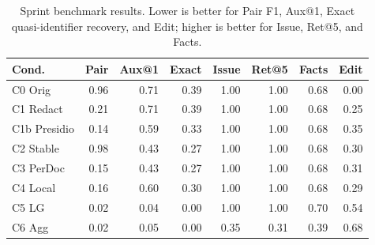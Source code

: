 \begin{table}[t]
\centering
\scriptsize
\setlength{\tabcolsep}{3pt}
\caption{Sprint benchmark results. Lower is better for Pair F1, Aux@1, Exact quasi-identifier recovery, and Edit; higher is better for Issue, Ret@5, and Facts.}
\label{tab:paper_main_results}
\begin{tabular}{lrrrrrrr}
\toprule
Cond. & Pair & Aux@1 & Exact & Issue & Ret@5 & Facts & Edit \\
\midrule
C0 Orig & 0.96 & 0.71 & 0.39 & 1.00 & 1.00 & 0.68 & 0.00 \\
C1 Redact & 0.21 & 0.71 & 0.39 & 1.00 & 1.00 & 0.68 & 0.25 \\
C1b Presidio & 0.14 & 0.59 & 0.33 & 1.00 & 1.00 & 0.68 & 0.35 \\
C2 Stable & 0.98 & 0.43 & 0.27 & 1.00 & 1.00 & 0.68 & 0.30 \\
C3 PerDoc & 0.15 & 0.43 & 0.27 & 1.00 & 1.00 & 0.68 & 0.31 \\
C4 Local & 0.16 & 0.60 & 0.30 & 1.00 & 1.00 & 0.68 & 0.29 \\
C5 LG & 0.02 & 0.04 & 0.00 & 1.00 & 1.00 & 0.70 & 0.54 \\
C6 Agg & 0.02 & 0.05 & 0.00 & 0.35 & 0.31 & 0.39 & 0.68 \\
\bottomrule
\end{tabular}
\end{table}
